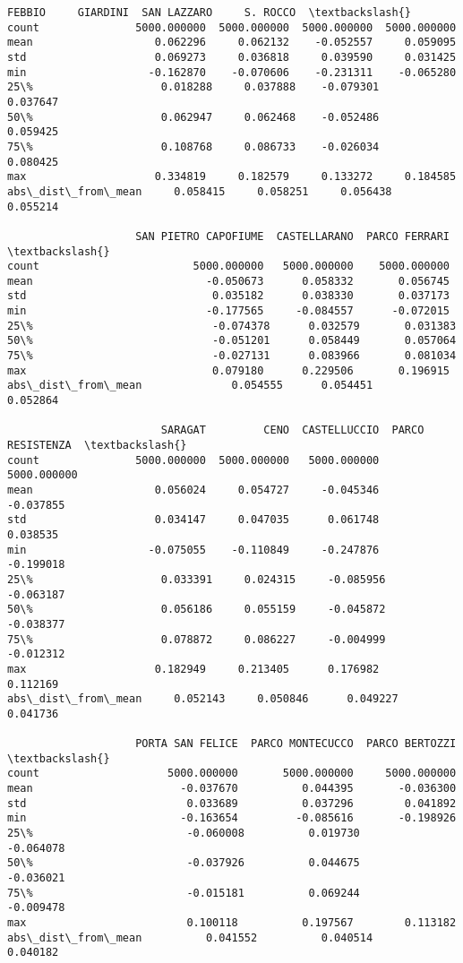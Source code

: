 \documentclass[11pt]{article}
\begin{document}
\begin{tcolorbox}[breakable, size=fbox, boxrule=.5pt, pad at break*=1mm, opacityfill=0]
\begin{Verbatim}[commandchars=\\\{\}]
                         FEBBIO     GIARDINI  SAN LAZZARO     S. ROCCO  \textbackslash{}
count               5000.000000  5000.000000  5000.000000  5000.000000
mean                   0.062296     0.062132    -0.052557     0.059095
std                    0.069273     0.036818     0.039590     0.031425
min                   -0.162870    -0.070606    -0.231311    -0.065280
25\%                    0.018288     0.037888    -0.079301     0.037647
50\%                    0.062947     0.062468    -0.052486     0.059425
75\%                    0.108768     0.086733    -0.026034     0.080425
max                    0.334819     0.182579     0.133272     0.184585
abs\_dist\_from\_mean     0.058415     0.058251     0.056438     0.055214

                    SAN PIETRO CAPOFIUME  CASTELLARANO  PARCO FERRARI  \textbackslash{}
count                        5000.000000   5000.000000    5000.000000
mean                           -0.050673      0.058332       0.056745
std                             0.035182      0.038330       0.037173
min                            -0.177565     -0.084557      -0.072015
25\%                            -0.074378      0.032579       0.031383
50\%                            -0.051201      0.058449       0.057064
75\%                            -0.027131      0.083966       0.081034
max                             0.079180      0.229506       0.196915
abs\_dist\_from\_mean              0.054555      0.054451       0.052864

                        SARAGAT         CENO  CASTELLUCCIO  PARCO RESISTENZA  \textbackslash{}
count               5000.000000  5000.000000   5000.000000       5000.000000
mean                   0.056024     0.054727     -0.045346         -0.037855
std                    0.034147     0.047035      0.061748          0.038535
min                   -0.075055    -0.110849     -0.247876         -0.199018
25\%                    0.033391     0.024315     -0.085956         -0.063187
50\%                    0.056186     0.055159     -0.045872         -0.038377
75\%                    0.078872     0.086227     -0.004999         -0.012312
max                    0.182949     0.213405      0.176982          0.112169
abs\_dist\_from\_mean     0.052143     0.050846      0.049227          0.041736

                    PORTA SAN FELICE  PARCO MONTECUCCO  PARCO BERTOZZI  \textbackslash{}
count                    5000.000000       5000.000000     5000.000000
mean                       -0.037670          0.044395       -0.036300
std                         0.033689          0.037296        0.041892
min                        -0.163654         -0.085616       -0.198926
25\%                        -0.060008          0.019730       -0.064078
50\%                        -0.037926          0.044675       -0.036021
75\%                        -0.015181          0.069244       -0.009478
max                         0.100118          0.197567        0.113182
abs\_dist\_from\_mean          0.041552          0.040514        0.040182


\end{Verbatim}
\end{tcolorbox}
\end{document}
